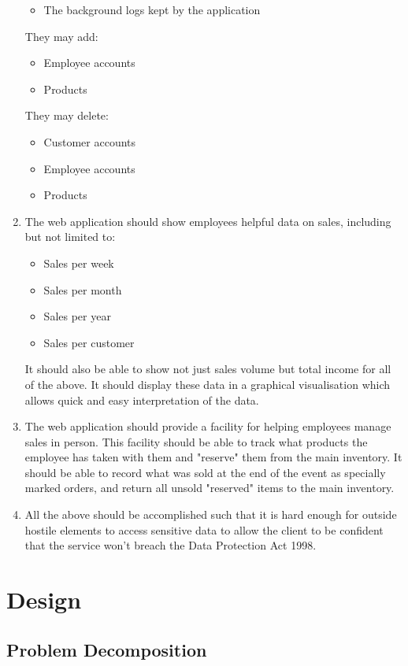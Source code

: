 ﻿\documentclass{article}
\begin{document}
\begin{enumerate}
\begin{itemize}
    \item The background logs kept by the application
    \end{itemize}
    They may add:
    \begin{itemize}
    \item Employee accounts
    \item Products
    \end{itemize}
    They may delete:
    \begin{itemize}
    \item Customer accounts
    \item Employee accounts
    \item Products
    \end{itemize}
    \item The web application should show employees helpful data on sales, including but not limited to:
    \begin{itemize}
    \item Sales per week
    \item Sales per month
    \item Sales per year
    \item Sales per customer
    \end{itemize}
    It should also be able to show not just sales volume but total income for all of the above. It should display these data in a graphical visualisation which allows quick and easy interpretation of the data.
    \item The web application should provide a facility for helping employees manage sales in person.
    This facility should be able to track what products the employee has taken with them and "reserve" them from the main inventory.
    It should be able to record what was sold at the end of the event as specially marked orders, and return all unsold "reserved" items to the main inventory.
    \item All the above should be accomplished such that it is hard enough for outside hostile elements to access sensitive data to allow the client to be confident that the service won't breach the Data Protection Act 1998.
    \end{enumerate}
    
    \section{Design}
    \subsection{Problem Decomposition}
\end{document}
